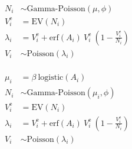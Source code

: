 \documentclass[12pt,preview,border=0]{standalone}
\newcommand\EV{V^\text{e}_{i}}
\newcommand\A{A_{i}}
\newcommand\N{N_{i}}
\newcommand\V{V_{i}}
\begin{document}
$$
\begin{aligned} 
    \N        & \sim \text{Gamma-Poisson}(\mu, \phi) \\
    \EV       &    = \text{EV}(\N) \\
    \lambda_i &    = \EV + \text{erf}(\A) ~ \EV ~ (1 - \frac{\EV}{\N}) \\
    \V        & \sim \text{Poisson}(\lambda_i)
\end{aligned}
$$
\\
$$
\begin{aligned}
    \mu_i     &    = \beta ~  \text{logistic}(\A) \\
    \N        & \sim \text{Gamma-Poisson}(\mu_i, \phi) \\
    \EV       &    = \text{EV}(\N) \\
    \lambda_i &    = \EV + \text{erf}(\A) ~ \EV ~ (1 - \frac{\EV}{\N}) \\
    \V        & \sim \text{Poisson}(\lambda_i)
\end{aligned}
$$
\end{document}
